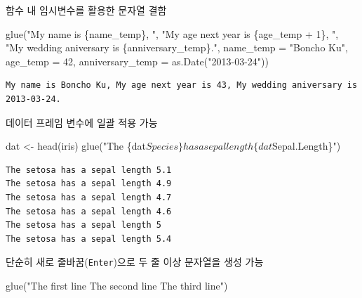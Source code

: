 \documentclass[
  11pt,
]{krantz}
\newenvironment{Shaded}{\begin{snugshade}}{\end{snugshade}}
\newcommand{\AttributeTok}[1]{\textcolor[rgb]{0.61,0.61,0.61}{#1}}
\newcommand{\DecValTok}[1]{\textcolor[rgb]{0.06,0.06,0.06}{#1}}
\newcommand{\FunctionTok}[1]{\textcolor[rgb]{0,0,0}{#1}}
\newcommand{\NormalTok}[1]{#1}
\newcommand{\OtherTok}[1]{\textcolor[rgb]{0.37,0.37,0.37}{#1}}
\newcommand{\StringTok}[1]{\textcolor[rgb]{0.5,0.5,0.5}{#1}}
\begin{document}
\normalsize

함수 내 임시변수를 활용한 문자열 결함

\footnotesize

\begin{Shaded}
\begin{Highlighting}[]
\FunctionTok{glue}\NormalTok{(}\StringTok{"My name is \{name\_temp\}, "}\NormalTok{, }
     \StringTok{"My age next year is \{age\_temp + 1\}, "}\NormalTok{, }
     \StringTok{"My wedding aniversary is \{anniversary\_temp\}."}\NormalTok{, }
     \AttributeTok{name\_temp =} \StringTok{"Boncho Ku"}\NormalTok{, }
     \AttributeTok{age\_temp =} \DecValTok{42}\NormalTok{, }
     \AttributeTok{anniversary\_temp =} \FunctionTok{as.Date}\NormalTok{(}\StringTok{"2013{-}03{-}24"}\NormalTok{))}
\end{Highlighting}
\end{Shaded}

\begin{verbatim}
My name is Boncho Ku, My age next year is 43, My wedding aniversary is 2013-03-24.
\end{verbatim}

\normalsize

데이터 프레임 변수에 일괄 적용 가능

\footnotesize

\begin{Shaded}
\begin{Highlighting}[]
\NormalTok{dat }\OtherTok{\textless{}{-}} \FunctionTok{head}\NormalTok{(iris)}
\FunctionTok{glue}\NormalTok{(}\StringTok{"The \{dat$Species\} has a sepal length \{dat$Sepal.Length\}"}\NormalTok{)}
\end{Highlighting}
\end{Shaded}

\begin{verbatim}
The setosa has a sepal length 5.1
The setosa has a sepal length 4.9
The setosa has a sepal length 4.7
The setosa has a sepal length 4.6
The setosa has a sepal length 5
The setosa has a sepal length 5.4
\end{verbatim}

\normalsize

단순히 새로 줄바꿈(\texttt{Enter})으로 두 줄 이상 문자열을 생성 가능

\footnotesize

\begin{Shaded}
\begin{Highlighting}[]
\FunctionTok{glue}\NormalTok{(}\StringTok{"The first line}
\StringTok{     The second line}
\StringTok{     The third line"}\NormalTok{)}
\end{Highlighting}
\end{Shaded}
\end{document}
